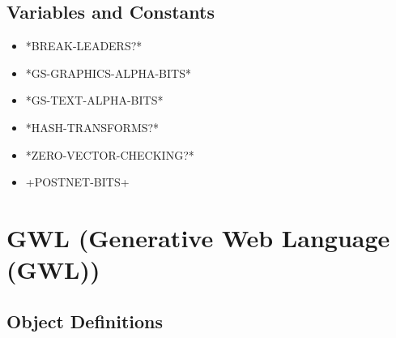 \documentclass [11pt]{book}
\begin{document}
\subsection{Variables and Constants}

\label{subsec:variablesandconstants}



\begin{itemize}

\item {}*BREAK-LEADERS?*





\item {}*GS-GRAPHICS-ALPHA-BITS*





\item {}*GS-TEXT-ALPHA-BITS*





\item {}*HASH-TRANSFORMS?*





\item {}*ZERO-VECTOR-CHECKING?*





\item {}+POSTNET-BITS+





\end{itemize}





\section{GWL (Generative Web Language (GWL))}

\label{sec:gwl(generativeweblanguage(gwl))}





\subsection{Object Definitions}

\label{subsec:objectdefinitions}
\end{document}
